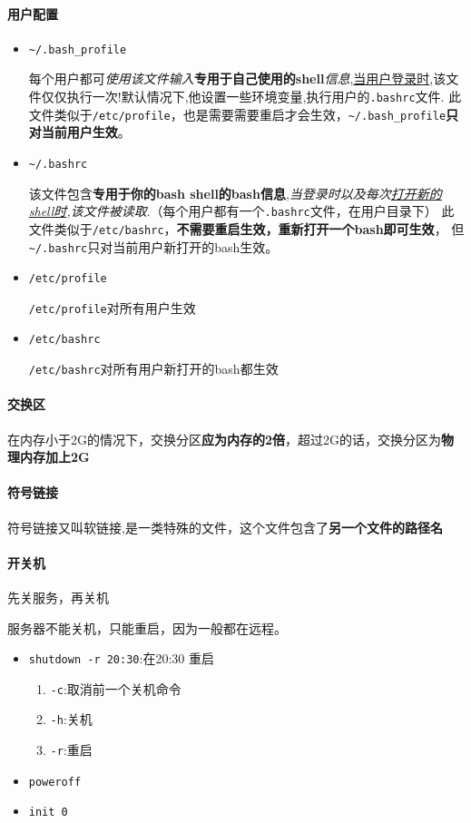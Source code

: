 \documentclass[UTF8,a4paper,12pt]{ctexbook}
\begin{document}
			\paragraph{用户配置}
				\begin{itemize}
					\item  \verb|~/.bash_profile|
					
						每个用户都可\textit{使用该文件输入}\textbf{专用于自己使用的shell}\textit{信息},\underline{当用户登录时},该文件仅仅执行一次!默认情况下,他设置一些环境变量,执行用户的\verb|.bashrc|文件. 此文件类似于\verb|/etc/profile|，也是需要需要重启才会生效，\verb|~/.bash_profile|\textbf{只对当前用户生效}。
					\item  \verb|~/.bashrc|
						
						该文件包含\textbf{专用于你的bash shell的bash信息},\textit{当登录时以及每次\underline{打开新的shell时},该文件被读取}.（每个用户都有一个\verb|.bashrc|文件，在用户目录下） 此文件类似于\verb|/etc/bashrc|，\textbf{不需要重启生效，重新打开一个bash即可生效}， 但\verb|~/.bashrc|只对当前用户新打开的bash生效。
						
					\item  \verb|/etc/profile|
					
						\verb|/etc/profile|对所有用户生效
					
					\item  \verb|/etc/bashrc|
					
						\verb|/etc/bashrc|对所有用户新打开的bash都生效
				\end{itemize}
			
			\paragraph{交换区} 在内存小于2G的情况下，交换分区\textbf{应为内存的2倍}，超过2G的话，交换分区为\textbf{物理内存加上2G}	
			
			\paragraph{符号链接}符号链接又叫软链接,是一类特殊的文件，这个文件包含了\textbf{另一个文件的路径名}
			
			\paragraph{开关机}
				先关服务，再关机
				
				服务器不能关机，只能重启，因为一般都在远程。
				
				\begin{itemize}[itemindent = 1em]
					\item \verb|shutdown -r 20:30|:在20:30 重启
						\begin{enumerate}
							\item \verb|-c|:取消前一个关机命令
							\item \verb|-h|:关机 
							\item \verb|-r|:重启
						\end{enumerate}
					\item \verb|poweroff|
					\item \verb|init 0|
				\end{itemize}
				
\end{document}
